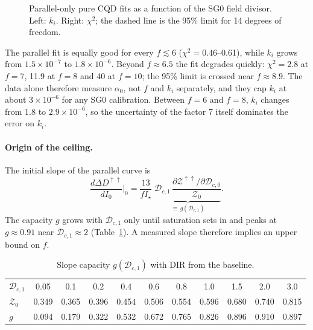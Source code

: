 \documentclass[11pt,a4paper]{article}
\newcommand{\D}{\mathcal{D}}
\newcommand{\Z}{\mathcal{Z}}
\newcommand{\pp}{{\uparrow\uparrow}}
\newcommand{\DIR}{\mathrm{DIR}}
\begin{document}
\begin{figure}[h]
\centering
{}
\caption{Parallel-only pure CQD fits as a function of the SG0 field divisor. Left: $k_i$. Right:
$\chi^2$; the dashed line is the 95\% limit for 14 degrees of freedom.}
\label{fig:fscan}
\end{figure}

The parallel fit is equally good for every $f\lesssim6$ ($\chi^2=0.46$--0.61), while $k_i$ grows from
$1.5\times10^{-7}$ to $1.8\times10^{-6}$. Beyond $f\approx6.5$ the fit degrades quickly:
$\chi^2=2.8$ at $f=7$, 11.9 at $f=8$ and 40 at $f=10$; the 95\% limit is crossed near $f\approx8.9$.
The data alone therefore measure $\alpha_0$, not $f$ and $k_i$ separately, and they cap $k_i$ at about
$3\times10^{-6}$ for any SG0 calibration. Between $f=6$ and $f=8$, $k_i$ changes from $1.8$ to
$2.9\times10^{-6}$, so the uncertainty of the factor 7 itself dominates the error on $k_i$.

\paragraph{Origin of the ceiling.} The initial slope of the parallel curve is
\begin{equation}
\frac{d\Delta D^\pp}{dI_0}\bigg|_0=\frac{13}{fI_\star}\;
\underbrace{\D_{c,1}\,\frac{\partial\Z^\pp/\partial\D_{c,0}}{\Z_0}}_{\equiv\,g(\D_{c,1})}.
\end{equation}
The capacity $g$ grows with $\D_{c,1}$ only until saturation sets in and peaks at $g\approx0.91$ near
$\D_{c,1}\approx2$ (Table~\ref{tab:g}). A measured slope therefore implies an upper bound on $f$.

\begin{table}[h]
\centering
\caption{Slope capacity $g(\D_{c,1})$ with $\DIR$ from the baseline.}
\label{tab:g}
\small\setlength{\tabcolsep}{4pt}
\begin{tabular}{lcccccccccc}
\toprule
$\D_{c,1}$ & 0.05 & 0.1 & 0.2 & 0.4 & 0.6 & 0.8 & 1.0 & 1.5 & 2.0 & 3.0\\
$\Z_0$ & 0.349 & 0.365 & 0.396 & 0.454 & 0.506 & 0.554 & 0.596 & 0.680 & 0.740 & 0.815\\
$g$ & 0.094 & 0.179 & 0.322 & 0.532 & 0.672 & 0.765 & 0.826 & 0.896 & 0.910 & 0.897\\
\bottomrule
\end{tabular}
\end{table}
\end{document}
